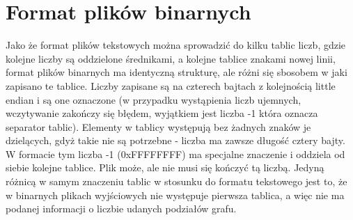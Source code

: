\documentclass{article}
\begin{document}
\section{Format plików binarnych}
    Jako że format plików tekstowych można sprowadzić do kilku tablic liczb, gdzie kolejne liczby są oddzielone średnikami, a kolejne tablice znakami nowej linii, format plików binarnych ma identyczną strukturę, ale różni się sbosobem w jaki zapisano te tablice. Liczby zapisane są na czterech bajtach z kolejnością little endian i są one oznaczone (w przypadku wystąpienia liczb ujemnych, wczytywanie zakończy się błędem, wyjątkiem jest liczba -1 która oznacza separator tablic). Elementy w tablicy występują bez żadnych znaków je dzielących, gdyż takie nie są potrzebne - liczba ma zawsze długość cztery bajty. W formacie tym liczba -1 (0xFFFFFFFF) ma specjalne znaczenie i oddziela od siebie kolejne tablice. Plik może, ale nie musi się kończyć tą liczbą. Jedyną różnicą w samym znaczeniu tablic w stosunku do formatu tekstowego jest to, że w binarnych plikach wyjściowych nie występuje pierwsza tablica, a więc nie ma podanej informacji o liczbie udanych podziałów grafu.
\end{document}
